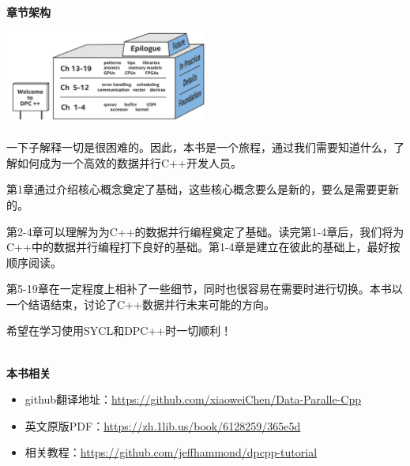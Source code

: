 \documentclass[11pt,a4paper,UTF8]{ctexart}
\begin{document}
	\hspace*{\fill} \\ %
	\noindent\textbf{章节架构}\ \par
	\begin{center}
		\includegraphics[width=0.5\textwidth]{images/struct-introduce}
	\end{center} \par
	一下子解释一切是很困难的。因此，本书是一个旅程，通过我们需要知道什么，了解如何成为一个高效的数据并行C++开发人员。\par
	
	第1章通过介绍核心概念奠定了基础，这些核心概念要么是新的，要么是需要更新的。\par
	
	第2-4章可以理解为为C++的数据并行编程奠定了基础。读完第1-4章后，我们将为C++中的数据并行编程打下良好的基础。第1-4章是建立在彼此的基础上，最好按顺序阅读。\par
	
	第5-19章在一定程度上相补了一些细节，同时也很容易在需要时进行切换。本书以一个结语结束，讨论了C++数据并行未来可能的方向。\par
	
	希望在学习使用SYCL和DPC++时一切顺利！\par
	
	\hspace*{\fill} \\ %
	\noindent\textbf{本书相关}\ \par
	\begin{itemize}
		\item github翻译地址：\href{https://github.com/xiaoweiChen/Data-Paralle-Cpp}{https://github.com/xiaoweiChen/Data-Paralle-Cpp}
		\item 英文原版PDF：\href{https://zh.1lib.us/book/6128259/365e5d}{https://zh.1lib.us/book/6128259/365e5d}
		\item 相关教程：\href{https://github.com/jeffhammond/dpcpp-tutorial}{https://github.com/jeffhammond/dpcpp-tutorial}
	\end{itemize}
	\newpage
	
	\tableofcontents
	\newpage
	
	\pagestyle{empty}
	
\end{document}
